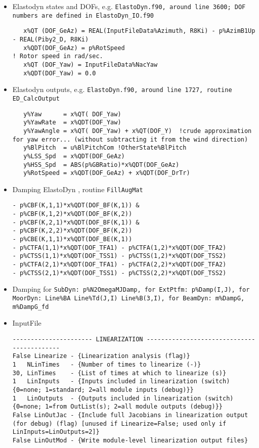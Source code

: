 \begin{itemize}
\item  Elastodyn states and DOFs, e.g. \tt{ElastoDyn.f90}, around line 3600; DOF numbers are defined in \tt{ElastoDyn\_IO.f90}
\begin{lstlisting}
   x%QT (DOF_GeAz) = REAL(InputFileData%Azimuth, R8Ki) - p%AzimB1Up - REAL(Piby2_D, R8Ki)
   x%QDT(DOF_GeAz) = p%RotSpeed                                               ! Rotor speed in rad/sec.
   x%QT (DOF_Yaw) = InputFileData%NacYaw
   x%QDT(DOF_Yaw) = 0.0
 \end{lstlisting}
\item  Elastodyn outputs, e.g. \tt{ElastoDyn.f90}, around line 1727, routine \tt{ED\_CalcOutput}
\begin{lstlisting}
   y%Yaw      = x%QT( DOF_Yaw)
   y%YawRate  = x%QDT(DOF_Yaw)
   y%YawAngle = x%QT( DOF_Yaw) + x%QT(DOF_Y)  !crude approximation for yaw error... (without subtracting it from the wind direction)   
   y%BlPitch  = u%BlPitchCom !OtherState%BlPitch
   y%LSS_Spd  = x%QDT(DOF_GeAz)
   y%HSS_Spd  = ABS(p%GBRatio)*x%QDT(DOF_GeAz)
   y%RotSpeed = x%QDT(DOF_GeAz) + x%QDT(DOF_DrTr)
 \end{lstlisting}
 \item Damping ElastoDyn , routine \tt{FillAugMat}
\begin{lstlisting}
- p%CBF(K,1,1)*x%QDT(DOF_BF(K,1)) &
- p%CBF(K,1,2)*x%QDT(DOF_BF(K,2))
- p%CBF(K,2,1)*x%QDT(DOF_BF(K,1)) &
- p%CBF(K,2,2)*x%QDT(DOF_BF(K,2))
- p%CBE(K,1,1)*x%QDT(DOF_BE(K,1))
- p%CTFA(1,1)*x%QDT(DOF_TFA1) - p%CTFA(1,2)*x%QDT(DOF_TFA2)
- p%CTSS(1,1)*x%QDT(DOF_TSS1) - p%CTSS(1,2)*x%QDT(DOF_TSS2)
- p%CTFA(2,1)*x%QDT(DOF_TFA1) - p%CTFA(2,2)*x%QDT(DOF_TFA2)
- p%CTSS(2,1)*x%QDT(DOF_TSS1) - p%CTSS(2,2)*x%QDT(DOF_TSS2)
\end{lstlisting}
\item Damping for \tt{SubDyn}: \tt{p\%N2OmegaMJDamp}, for \tt{ExtPtfm}:  \tt{p\%Damp(I,J)}, for \tt{MoorDyn}: \tt{Line\%BA} \tt{Line\%Td(J,I)} \tt{Line\%B(3,I)}, for \tt{BeamDyn}: \tt{m\%DampG}, \tt{m\%DampG\_fd}


\item InputFile
\begin{lstlisting}
---------------------- LINEARIZATION -------------------------------------------
False Linearize - {Linearization analysis (flag)}
1   NLinTimes   - {Number of times to linearize (-)}
30, LinTimes    - {List of times at which to linearize (s)}
1   LinInputs   - {Inputs included in linearization (switch) {0=none; 1=standard; 2=all module inputs (debug)}}
1   LinOutputs  - {Outputs included in linearization (switch) {0=none; 1=from OutList(s); 2=all module outputs (debug)}}
False LinOutJac - {Include full Jacobians in linearization output (for debug) (flag) [unused if Linearize=False; used only if LinInputs=LinOutputs=2]}
False LinOutMod - {Write module-level linearization output files}
\end{lstlisting}

\end{itemize}







